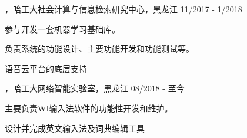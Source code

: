 
\begin{cventries}

\cvexperience
{，哈工大社会计算与信息检索研究中心，黑龙江}
{11/2017 - 1/2018}
{
    \begin{cvitems}
    \item {参与开发一套机器学习基础库。}
    \item {负责系统的功能设计、主要功能开发和功能测试等。}
    \item {\href{https://www.ltp-cloud.com/}{语音云平台}的底层支持}
    \end{cvitems}
}

\cvexperience
{，哈工大网络智能实验室，黑龙江}
{08/2018 - 至今}
{
    \begin{cvitems}
    \item {主要负责WI输入法软件的功能性开发和维护。}
    \item {设计并完成英文输入法及词典编辑工具}
    \end{cvitems}
}

\end{cventries}
